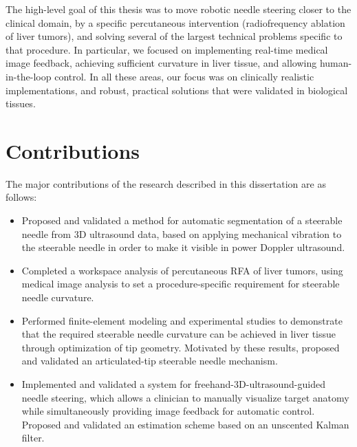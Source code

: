 The high-level goal of this thesis was to move robotic needle steering closer to the clinical domain, by a specific percutaneous intervention (radiofrequency ablation of liver tumors), and solving several of the largest technical problems specific to that procedure. In particular, we focused on implementing real-time medical image feedback, achieving sufficient curvature in liver tissue, and allowing human-in-the-loop control. In all these areas, our focus was on clinically realistic implementations, and robust, practical solutions that were validated in biological tissues.  

\section{Contributions}
The major contributions of the research described in this dissertation are as follows:
\begin{itemize}
\item Proposed and validated a method for automatic segmentation of a steerable needle from 3D ultrasound data, based on applying mechanical vibration to the steerable needle in order to make it visible in power Doppler ultrasound.
\item Completed a workspace analysis of percutaneous RFA of liver tumors, using medical image analysis to set a procedure-specific requirement for steerable needle curvature.  
\item Performed finite-element modeling and experimental studies to demonstrate that the required steerable needle curvature can be achieved in liver tissue through optimization of tip geometry. Motivated by these results, proposed and validated an articulated-tip steerable needle mechanism.   
\item Implemented and validated a system for freehand-3D-ultrasound-guided needle steering, which allows a clinician to manually visualize target anatomy while simultaneously providing image feedback for automatic control. Proposed and validated an estimation scheme based on an unscented Kalman filter. 
\end{itemize}

